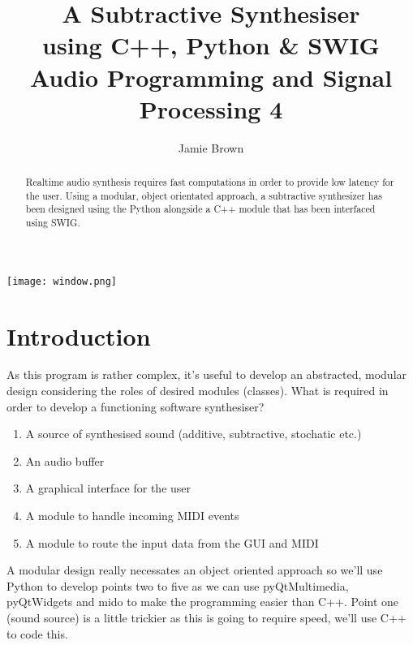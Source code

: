 \documentclass{article}
\title{\textbf{A Subtractive Synthesiser \\ using C++, Python \& SWIG\\
\large Audio Programming and Signal Processing 4 }}
\date{}
\author{Jamie Brown}
\begin{document}
	\vspace{100mm}
	\maketitle
	\thispagestyle{fancy}
\centering
\begin{abstract}
	Realtime audio synthesis requires fast computations in order to provide low latency for the user. Using a modular, object orientated approach, a subtractive synthesizer has been designed using the Python alongside a C++ module that has been interfaced using SWIG. 
\end{abstract}
\vspace{2cm}
\texttt{[image: window.png]} 
\pagebreak
\flushleft
\section{Introduction}
As this program is rather complex, it's useful to develop an abstracted, modular design considering the roles of desired modules (classes). What is required in order to develop a functioning software synthesiser?

\begin{enumerate}
	\item A source of synthesised sound (additive, subtractive, stochatic etc.)
	\item An audio buffer
	\item A graphical interface for the user
	\item A module to handle incoming MIDI events
	\item A module to route the input data from the GUI and MIDI
\end{enumerate} 
A modular design really necessates an object oriented approach so we'll use Python to develop points two to five as we can use pyQtMultimedia, pyQtWidgets and mido  to make the programming easier than C++. Point one (sound source) is a little trickier as this is going to require speed, we'll use C++ to code this.
\end{document}
